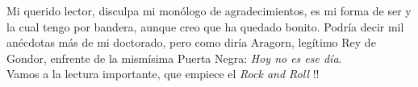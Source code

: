 Mi querido lector, disculpa mi monólogo de agradecimientos, es mi forma de ser y la cual tengo por bandera, aunque creo que ha quedado bonito. Podría decir mil anécdotas más de mi doctorado, pero como diría Aragorn, legítimo Rey de Gondor, enfrente de la mismísima Puerta Negra: \textit{Hoy no es ese día}. \\

Vamos a la lectura importante, que empiece el \textit{Rock and Roll} !!



